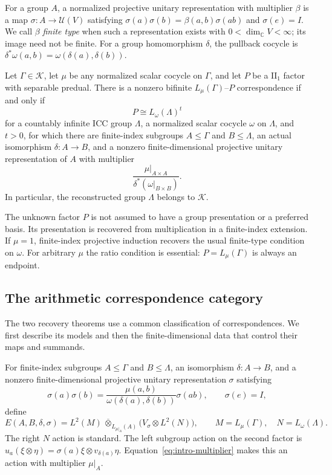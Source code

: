 For a group $A$, a normalized projective unitary representation with
multiplier $\beta$ is a map $\sigma:A\to\mathcal U(V)$ satisfying
$\sigma(a)\sigma(b)=\beta(a,b)\sigma(ab)$ and $\sigma(e)=I$.
We call $\beta$ \emph{finite type} when such a representation exists with
$0<\dim_{\mathbb C}V<\infty$; its image need not be finite. For a
group homomorphism $\delta$, the pullback cocycle is
$\delta^*\omega(a,b)=\omega(\delta(a),\delta(b))$.

\begin{samepage}
\begin{theorem}\label{thm:endpoints}
Let $\Gamma\in\mathscr K$, let $\mu$ be any normalized scalar cocycle on
$\Gamma$, and let $P$ be a $\mathrm{II}_1$ factor with separable predual.
There is a nonzero bifinite $L_\mu(\Gamma)$--$P$ correspondence if and only if
\[
 P\cong L_\omega(\Lambda)^t
\]
for a countably infinite ICC group $\Lambda$, a normalized scalar cocycle
$\omega$ on $\Lambda$, and $t>0$, for which there are finite-index
subgroups $A\leq\Gamma$ and $B\leq\Lambda$, an actual isomorphism
$\delta:A\to B$, and a nonzero finite-dimensional projective unitary
representation of $A$ with multiplier
\[
 \frac{\mu|_{A\times A}}{\delta^*(\omega|_{B\times B})}.
\]
In particular, the reconstructed group $\Lambda$ belongs to $\mathscr K$.
\end{theorem}
\end{samepage}

The unknown factor $P$ is not assumed to have a group presentation or a
preferred basis. Its presentation is recovered from multiplication in a
finite-index extension. If $\mu=1$, finite-index projective induction
recovers the usual finite-type condition on $\omega$. For arbitrary $\mu$
the ratio condition is essential: $P=L_\mu(\Gamma)$ is always an endpoint.

\subsection{The arithmetic correspondence category}
The two recovery theorems use a common classification of correspondences.
We first describe its models and then the finite-dimensional data that
control their maps and summands.

For finite-index subgroups $A\leq\Gamma$ and $B\leq\Lambda$, an
isomorphism $\delta:A\to B$, and a nonzero finite-dimensional projective
unitary representation $\sigma$ satisfying
\begin{equation}\label{eq:intro-multiplier}
 \sigma(a)\sigma(b)
 =\frac{\mu(a,b)}{\omega(\delta(a),\delta(b))}\sigma(ab),
 \qquad \sigma(e)=I,
\end{equation}
define
\begin{equation}\label{eq:intro-model}
 E(A,B,\delta,\sigma)
 =L^2(M)\,\overline\otimes_{L_{\mu|_A}(A)}
       \bigl(V_\sigma\otimes L^2(N)\bigr),
 \qquad M=L_\mu(\Gamma),\quad N=L_\omega(\Lambda).
\end{equation}
The right $N$ action is standard. The left subgroup action on the second
factor is
$u_a(\xi\otimes\eta)=\sigma(a)\xi\otimes v_{\delta(a)}\eta$.
Equation~\eqref{eq:intro-multiplier} makes this an action with multiplier
$\mu|_A$.


